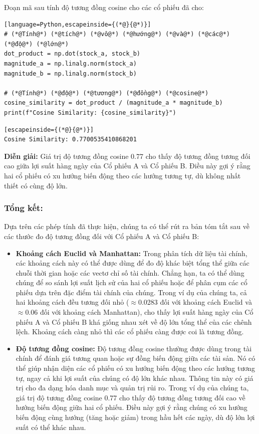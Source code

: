 Đoạn mã sau tính độ tương đồng cosine cho các cổ phiếu đã cho:

\begin{lstlisting}[language=Python,escapeinside={(*@}{@*)}]
# (*@Tính@*) (*@tích@*) (*@vô@*) (*@hướng@*) (*@và@*) (*@các@*) (*@độ@*) (*@lớn@*)
dot_product = np.dot(stock_a, stock_b)
magnitude_a = np.linalg.norm(stock_a)
magnitude_b = np.linalg.norm(stock_b)

# (*@Tính@*) (*@độ@*) (*@tương@*) (*@đồng@*) (*@cosine@*)
cosine_similarity = dot_product / (magnitude_a * magnitude_b)
print(f"Cosine Similarity: {cosine_similarity}")
\end{lstlisting}

\begin{lstlisting}[escapeinside={(*@}{@*)}]
Cosine Similarity: 0.7700535410868201
\end{lstlisting}

\textbf{Diễn giải:} Giá trị độ tương đồng cosine 0.77 cho thấy độ tương đồng tương đối cao giữa lợi suất hàng ngày của Cổ phiếu A và Cổ phiếu B. Điều này gợi ý rằng hai cổ phiếu có xu hướng biến động theo các hướng tương tự, dù không nhất thiết có cùng độ lớn.

\subsubsection*{Tổng kết:}

Dựa trên các phép tính đã thực hiện, chúng ta có thể rút ra bản tóm tắt sau về các thước đo độ tương đồng đối với Cổ phiếu A và Cổ phiếu B:

\begin{itemize}
  \item \textbf{Khoảng cách Euclid và Manhattan:} Trong phân tích dữ liệu tài chính, các khoảng cách này có thể được dùng để đo độ khác biệt tổng thể giữa các chuỗi thời gian hoặc các vectơ chỉ số tài chính. Chẳng hạn, ta có thể dùng chúng để so sánh lợi suất lịch sử của hai cổ phiếu hoặc để phân cụm các cổ phiếu dựa trên đặc điểm tài chính của chúng. Trong ví dụ của chúng ta, cả hai khoảng cách đều tương đối nhỏ ($\approx$0.0283 đối với khoảng cách Euclid và $\approx$0.06 đối với khoảng cách Manhattan), cho thấy lợi suất hàng ngày của Cổ phiếu A và Cổ phiếu B khá giống nhau xét về độ lớn tổng thể của các chênh lệch. Khoảng cách càng nhỏ thì các cổ phiếu càng được coi là tương đồng.
  \item \textbf{Độ tương đồng cosine:} Độ tương đồng cosine thường được dùng trong tài chính để đánh giá tương quan hoặc sự đồng biến động giữa các tài sản. Nó có thể giúp nhận diện các cổ phiếu có xu hướng biến động theo các hướng tương tự, ngay cả khi lợi suất của chúng có độ lớn khác nhau. Thông tin này có giá trị cho đa dạng hóa danh mục và quản trị rủi ro. Trong ví dụ của chúng ta, giá trị độ tương đồng cosine 0.77 cho thấy độ tương đồng tương đối cao về hướng biến động giữa hai cổ phiếu. Điều này gợi ý rằng chúng có xu hướng biến động cùng hướng (tăng hoặc giảm) trong hầu hết các ngày, dù độ lớn lợi suất có thể khác nhau.
\end{itemize}


